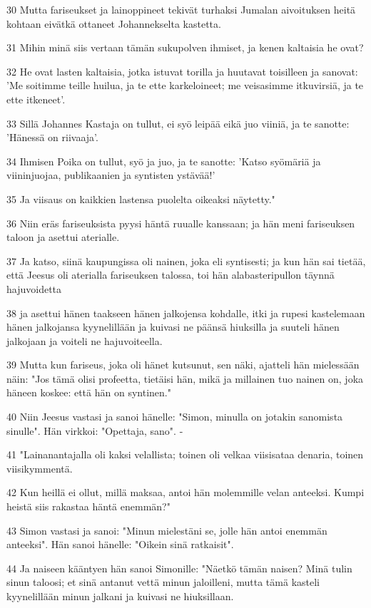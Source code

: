 \par 30 Mutta fariseukset ja lainoppineet tekivät turhaksi Jumalan aivoituksen heitä kohtaan eivätkä ottaneet Johannekselta kastetta.
\par 31 Mihin minä siis vertaan tämän sukupolven ihmiset, ja kenen kaltaisia he ovat?
\par 32 He ovat lasten kaltaisia, jotka istuvat torilla ja huutavat toisilleen ja sanovat: 'Me soitimme teille huilua, ja te ette karkeloineet; me veisasimme itkuvirsiä, ja te ette itkeneet'.
\par 33 Sillä Johannes Kastaja on tullut, ei syö leipää eikä juo viiniä, ja te sanotte: 'Hänessä on riivaaja'.
\par 34 Ihmisen Poika on tullut, syö ja juo, ja te sanotte: 'Katso syömäriä ja viininjuojaa, publikaanien ja syntisten ystävää!'
\par 35 Ja viisaus on kaikkien lastensa puolelta oikeaksi näytetty."
\par 36 Niin eräs fariseuksista pyysi häntä ruualle kanssaan; ja hän meni fariseuksen taloon ja asettui aterialle.
\par 37 Ja katso, siinä kaupungissa oli nainen, joka eli syntisesti; ja kun hän sai tietää, että Jeesus oli aterialla fariseuksen talossa, toi hän alabasteripullon täynnä hajuvoidetta
\par 38 ja asettui hänen taakseen hänen jalkojensa kohdalle, itki ja rupesi kastelemaan hänen jalkojansa kyynelillään ja kuivasi ne päänsä hiuksilla ja suuteli hänen jalkojaan ja voiteli ne hajuvoiteella.
\par 39 Mutta kun fariseus, joka oli hänet kutsunut, sen näki, ajatteli hän mielessään näin: "Jos tämä olisi profeetta, tietäisi hän, mikä ja millainen tuo nainen on, joka häneen koskee: että hän on syntinen."
\par 40 Niin Jeesus vastasi ja sanoi hänelle: "Simon, minulla on jotakin sanomista sinulle". Hän virkkoi: "Opettaja, sano". -
\par 41 "Lainanantajalla oli kaksi velallista; toinen oli velkaa viisisataa denaria, toinen viisikymmentä.
\par 42 Kun heillä ei ollut, millä maksaa, antoi hän molemmille velan anteeksi. Kumpi heistä siis rakastaa häntä enemmän?"
\par 43 Simon vastasi ja sanoi: "Minun mielestäni se, jolle hän antoi enemmän anteeksi". Hän sanoi hänelle: "Oikein sinä ratkaisit".
\par 44 Ja naiseen kääntyen hän sanoi Simonille: "Näetkö tämän naisen? Minä tulin sinun taloosi; et sinä antanut vettä minun jaloilleni, mutta tämä kasteli kyynelillään minun jalkani ja kuivasi ne hiuksillaan.
